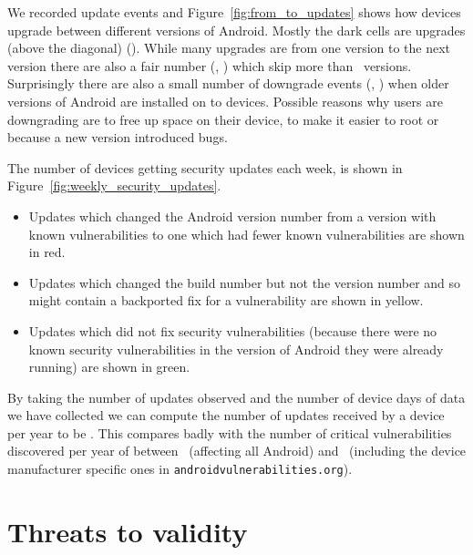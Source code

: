 \documentclass[conference,a4paper,twoside]{IEEEtran}
\newcommand{\avo}{\texttt{androidvulnerabilities.org}}
\begin{document}
We recorded update events and Figure~\ref{fig:from_to_updates} shows how devices upgrade between different versions of Android.
Mostly the dark cells are upgrades (above the diagonal) (\daNumUpdatesUpgrades).
While many upgrades are from one version to the next version there are also a fair number (\daNumUpdatesBigUpgrades, \daPercBigUpgrades) which skip more than \daNumUpdatesSkippedBig\ versions.
Surprisingly there are also a small number of downgrade events (\daNumUpdatesDowngrades, \daPercUpdatesDowngrades) when older versions of Android are installed on to devices.
Possible reasons why users are downgrading are to free up space on their device, to make it easier to root or because a new version introduced bugs.

The number of devices getting security updates each week, is shown in Figure~\ref{fig:weekly_security_updates}.
\begin{itemize}
 \item Updates which changed the Android version number from a version with known vulnerabilities to one which had fewer known vulnerabilities are shown in red.
 \item Updates which changed the build number but not the version number and so might contain a backported fix for a vulnerability are shown in yellow.
\item Updates which did not fix security vulnerabilities (because there were no known security vulnerabilities in the version of Android they were already running) are shown in green.

\end{itemize}

By taking the number of updates observed and the number of device days of data we have collected we can compute the number of updates received by a device per year to be \daUpdatesPerYear.
This compares badly with the number of critical vulnerabilities discovered per year of between \avoVulnsPerYearAllAndroid\ (affecting all Android) and \avoVulnsPerYear\ (including the device manufacturer specific ones in \avo).





\section{Threats to validity}
\end{document}

